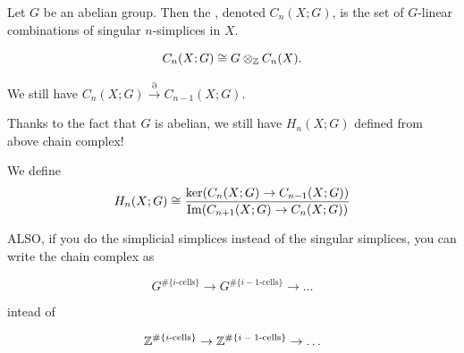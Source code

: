 \documentclass[11pt,leqno,oneside]{amsart}
\numberwithin{thm}{section}
\renewcommand{\d}{\partial}
\newcommand{\homl}[1][n]{H_{#1}}
\begin{document}
\begin{defn}
  Let $G$ be an abelian group.  Then the , denoted $C_n(X; G)$, is the set of $G$-linear combinations of singular $n$-simplices in $X$.
\end{defn}
\begin{prop}
  $$C_n(X; G) \mathrel{\cong} G \otimes_{\mathbb Z} C_n(X).$$
\end{prop}
We still have $C_n(X; G) \overset{\d}{\to} C_{n-1}(X; G)$.

Thanks to the fact that $G$ is abelian, we still have $\homl(X; G)$
defined from above chain complex!
\begin{defn}
  We define \[
    \homl(X;G) \isom \frac{\ker (C_n(X;G) \to C_{n-1}(X;G))}{\im
      (C_{n+1}(X;G) \to C_n(X;G))}
  \]
\end{defn}

ALSO, if you do the simplicial simplices instead of the singular simplices, you can write the chain complex as

$$G^{\#\{\text{$i$-cells}\}} \to G^{\#\{\text{$i-1$-cells}\}} \to \ldots$$

intead of

$${\mathbb Z}^{\#\{\text{$i$-cells}\}} \to {\mathbb Z}^{\#\{\text{$i-1$-cells}\}} \to \ldots$$
\end{document}
